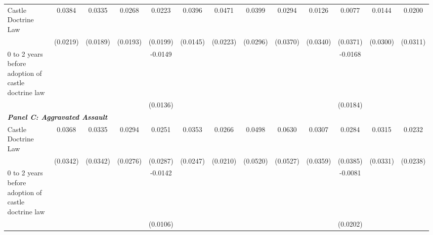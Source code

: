 {\begin{tabular}{l*{12}{c}}
Castle Doctrine Law &      0.0384         &      0.0335         &      0.0268         &      0.0223         &      0.0396\sym{**} &      0.0471\sym{*}  &      0.0399         &      0.0294         &      0.0126         &      0.0077         &      0.0144         &      0.0200         \\
&    (0.0219)         &    (0.0189)         &    (0.0193)         &    (0.0199)         &    (0.0145)         &    (0.0223)         &    (0.0296)         &    (0.0370)         &    (0.0340)         &    (0.0371)         &    (0.0300)         &    (0.0311)         \\
0 to 2 years before adoption of castle doctrine law&                     &                     &                     &     -0.0149         &                     &                     &                     &                     &                     &     -0.0168         &                     &                     \\
&                     &                     &                     &    (0.0136)         &                     &                     &                     &                     &                     &    (0.0184)         &                     &                     \\
\hline
\multicolumn{12}{l}{\linebreak \textbf{\textit{Panel C: Aggravated Assault}}} \\
Castle Doctrine Law &      0.0368         &      0.0335         &      0.0294         &      0.0251         &      0.0353         &      0.0266         &      0.0498         &      0.0630         &      0.0307         &      0.0284         &      0.0315         &      0.0232         \\
&    (0.0342)         &    (0.0342)         &    (0.0276)         &    (0.0287)         &    (0.0247)         &    (0.0210)         &    (0.0520)         &    (0.0527)         &    (0.0359)         &    (0.0385)         &    (0.0331)         &    (0.0238)         \\
0 to 2 years before adoption of castle doctrine law&                     &                     &                     &     -0.0142         &                     &                     &                     &                     &                     &     -0.0081         &                     &                     \\
&                     &                     &                     &    (0.0106)         &                     &                     &                     &                     &                     &    (0.0202)         &                     &                     \\

\end{tabular}}
